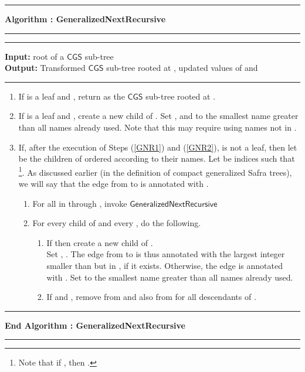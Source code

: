 \documentclass[3p]{elsarticle}
\newcommand{\CGS}{\ensuremath{\textsf{CGS }}}
\newcommand{\algo}[1]{\ensuremath{\textsf{{#1}}}}
\newcommand{\algoblock}[4]{{{{
                                     \vspace{5mm}
                                     \hrule 
				     \vspace{2mm} 
                                     \noindent \textsf{\bfseries Algorithm : {#1}}
				     \vspace{2mm} 
                                     \hrule 
				     \vspace{2mm}
                                     \hrule 
				     \vspace{2mm}
                                     \noindent \textsf{ {\bfseries Input:} {#2}}\\
                                     \noindent \textsf{ {\bfseries Output:} {#3}}
				     \vspace{2mm}
				     \hrule
				     \vspace{2mm}
{#4} 
				     \vspace{2mm}
				     \hrule
				     \vspace{2mm}
                                     \noindent \textsf{\bfseries End Algorithm : {#1}}}
				     \vspace{2mm}
                                     \hrule 
				     \vspace{2mm}
                          }}
                         }
\begin{document}
\algoblock{GeneralizedNextRecursive}
{ root of a \CGS sub-tree}
{ Transformed \CGS sub-tree rooted at , updated values of  and }
{
  \begin{enumerate}

  \item \label{GNR1} If  is a leaf and ,
    return  as the \CGS sub-tree rooted at .
    
  \item \label{GNR2} If  is a leaf and , create a
    new child  of .  Set ,  and  to the smallest name
    greater than all names already used.  Note that this may require
    using names not in .
    
  \item \label{GNR3} If, after the execution of Steps (\ref{GNR1}) and
    (\ref{GNR2}),  is not a leaf, then let  be the
    children of  ordered according to their names.  Let  be indices such that  \footnote{Note that if ,
      then .}.  As discussed earlier (in the definition of
    compact generalized Safra trees), we will say that the edge from
     to  is annotated with .
    
    \begin{enumerate}
      
    \item \label{GNR31} For all  in  through , invoke \algo{GeneralizedNextRecursive}
      


    \item \label{GNR32} For every child  of  and every , do
      the following. 
      
      \begin{enumerate}
        
      \item \label{GNR3a} If  then 
create a new child  of .\\  Set ,
        .  The edge from  to  is
        thus annotated with the largest integer smaller
        than  but in , if it exists.  Otherwise, the edge
        is annotated with .  Set  to the smallest
        name greater than all names already used.
        
      \item \label{GNR3b} If  and , remove  from
         and also from  for all descendants
         of .



      \end{enumerate}
      
      
    \end{enumerate}
    

\end{enumerate}}
\end{document}
